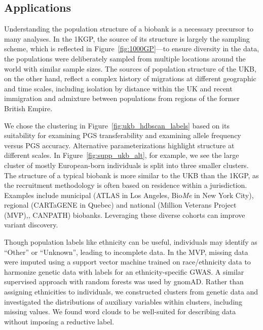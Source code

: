 \subsection{Applications}

Understanding the population structure of a biobank is a necessary precursor to many analyses. In the 1KGP, the source of its structure is largely the sampling scheme, which is reflected in Figure~\ref{fig:1000GP}---to ensure diversity in the data, the populations were deliberately sampled from multiple locations around the world with similar sample sizes. The sources of population structure of the UKB, on the other hand, reflect a complex history of migrations at different geographic and time scales, including isolation by distance within the UK and recent immigration and admixture between populations from regions of the former British Empire.

We chose the clustering in Figure~\ref{fig:ukb_hdbscan_labels} based on its suitability for examining PGS transferability and examining allele frequency versus PGS accuracy. Alternative parameterizations highlight structure at different scales. In Figure~\ref{fig:supp_ukb_alt}, for example, we see the large cluster of mostly European-born individuals is split into three smaller clusters. The structure of a typical biobank is more similar to the UKB than the 1KGP, as the recruitment methodology is often based on residence within a jurisdiction. Examples include municipal (ATLAS in Los Angeles\citep{caggiano_disease_2023}, Bio\emph{Me} in New York City\citep{belbin_toward_2021}), regional (CARTaGENE in Quebec\citep{awadalla_cohort_2013}) and national (Million Veterans Project (MVP),\citep{hunter-zinck_genotyping_2020}, CANPATH\citep{dummer_canadian_2018}) biobanks. Leveraging these diverse cohorts can improve variant discovery\citep{wojcik_genetic_2019,lin_admixed_2021}.

Though population labels like ethnicity can be useful, individuals may identify as ``Other'' or ``Unknown'', leading to incomplete data. In the MVP, missing data were imputed using a support vector machine trained on race/ethnicity data to harmonize genetic data with labels for an ethnicity-specific GWAS\citep{fang_harmonizing_2019}. A similar supervised approach with random forests was used by gnomAD\citep{karczewski_mutational_2020}. Rather than assigning ethnicities to individuals, we constructed clusters from genetic data and investigated the distributions of auxiliary variables within clusters, including missing values. We found word clouds to be well-suited for describing data without imposing a reductive label.   

